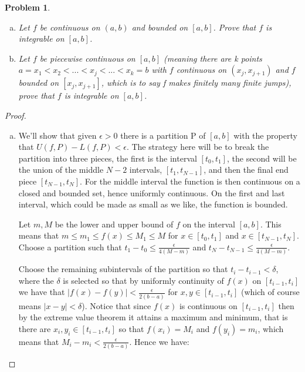 \documentclass[11pt]{article}
\theoremstyle{plain}
\newtheorem{problem}{Problem}
\theoremstyle{remark}
\begin{document}
\begin{problem}
	\begin{enumerate}[a.]
		\item Let $f$ be continuous on $(a,b)$ and bounded on $[a,b]$. Prove that $f$ is integrable on $[a,b]$.
		\item Let $f$ be piecewise continuous on $[a,b]$ (meaning there are k points $a=x_1<x_2<...<x_j<...<x_k=b$ with $f$ continuous on $(x_j,x_{j+1})$ and $f$ bounded on $[x_j,x_{j+1}]$, which is to say f makes finitely many finite jumps), prove that $f$ is integrable on $[a,b]$.
	\end{enumerate}
\end{problem}
\begin{proof}
	
	\begin{enumerate}[a.]
		\item We'll show that given $\epsilon>0$ there is a partition P of $[a,b]$ with the property that $U(f,P)-L(f,P)<\epsilon$. The strategy here will be to break the partition into three pieces, the first is the interval $[t_0,t_1]$, the second will be the union of the middle $N-2$ intervals, $[t_1,t_{N-1}]$, and then the final end piece $[t_{N-1},t_N]$. For the middle interval the function is then continuous on a closed and bounded set, hence uniformly continuous. On the first and last interval, which could be made as small as we like, the function is bounded.
		
		Let $m,M$ be the lower and upper bound of $f$ on the interval $[a,b]$. This means that $m\leq m_1 \leq f(x) \leq M_1 \leq M$ for $x\in [t_0,t_1]$ and $x\in [t_{N-1},t_N]$. Choose a partition such that $t_1-t_0\leq \frac{\epsilon}{4(M-m)}$ and $t_N-t_{N-1}\leq \frac{\epsilon}{4(M-m)}$. 
		
		Choose the remaining subintervals of the partition so that $t_i-t_{i-1}<\delta$, where the $\delta$ is selected so that by uniformly continuity of $f(x)$ on $[t_{i-1},t_i]$ we have that $|f(x)-f(y)|<\frac{\epsilon}{2(b-a)}$ for $x,y\in[t_{i-1},t_i]$ (which of course means $|x-y|<\delta$). Notice that since $f(x)$ is continuous on $[t_{i-1},t_i]$ then by the extreme value theorem it attains a maximum and minimum, that is there are $x_i,y_i\in[t_{i-1},t_i]$ so that $f(x_i)=M_i$ and $f(y_i)=m_i$, which means that $M_i-m_i<\frac{\epsilon}{2(b-a)}$.
		Hence we have:
		

\end{enumerate}
\end{proof}
\end{document}

